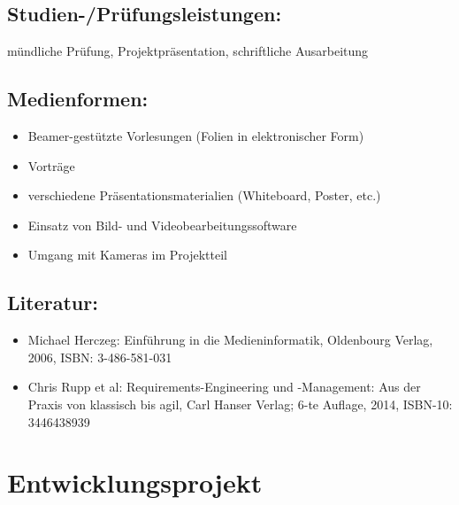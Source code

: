\section*{Studien-/Prüfungsleistungen:}\label{studien-pruxfcfungsleistungen-8}

mündliche Prüfung, Projektpräsentation, schriftliche Ausarbeitung

\section*{Medienformen:}\label{medienformen-5}

\begin{itemize}
\item
  Beamer-gestützte Vorlesungen (Folien in elektronischer Form)
\item
  Vorträge
\item
  verschiedene Präsentationsmaterialien (Whiteboard, Poster, etc.)
\item
  Einsatz von Bild- und Videobearbeitungssoftware
\item
  Umgang mit Kameras im Projektteil
\end{itemize}

\section*{Literatur:}\label{literatur-7}

\begin{itemize}
\item
  Michael Herczeg: Einführung in die Medieninformatik, Oldenbourg
  Verlag, 2006, ISBN: 3-486-581-031
\item
  Chris Rupp et al: Requirements-Engineering und -Management: Aus der
  Praxis von klassisch bis agil, Carl Hanser Verlag; 6-te Auflage, 2014,
  ISBN-10: 3446438939
\end{itemize}

\chapter{Entwicklungsprojekt}\label{entwicklungsprojekt}

